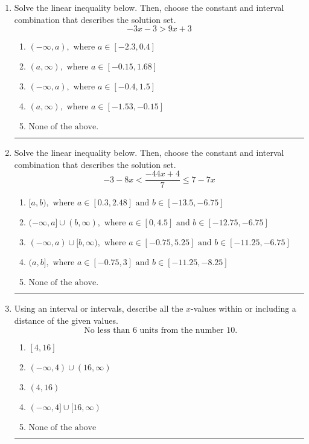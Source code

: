 \documentclass[14pt]{extbook}
\newcommand{\litem}[1]{\item#1\hspace*{-1cm}\rule{\textwidth}{0.4pt}}
\begin{document}
\begin{enumerate}
\litem{
Solve the linear inequality below. Then, choose the constant and interval combination that describes the solution set.\[ -3x -3 > 9x + 3 \]\begin{enumerate}[label=\Alph*.]
\item \( (-\infty, a), \text{ where } a \in [-2.3, 0.4] \)
\item \( (a, \infty), \text{ where } a \in [-0.15, 1.68] \)
\item \( (-\infty, a), \text{ where } a \in [-0.4, 1.5] \)
\item \( (a, \infty), \text{ where } a \in [-1.53, -0.15] \)
\item \( \text{None of the above}. \)

\end{enumerate} }
\litem{
Solve the linear inequality below. Then, choose the constant and interval combination that describes the solution set.\[ -3 - 8 x < \frac{-44 x + 4}{7} \leq 7 - 7 x \]\begin{enumerate}[label=\Alph*.]
\item \( [a, b), \text{ where } a \in [0.3, 2.48] \text{ and } b \in [-13.5, -6.75] \)
\item \( (-\infty, a] \cup (b, \infty), \text{ where } a \in [0, 4.5] \text{ and } b \in [-12.75, -6.75] \)
\item \( (-\infty, a) \cup [b, \infty), \text{ where } a \in [-0.75, 5.25] \text{ and } b \in [-11.25, -6.75] \)
\item \( (a, b], \text{ where } a \in [-0.75, 3] \text{ and } b \in [-11.25, -8.25] \)
\item \( \text{None of the above.} \)

\end{enumerate} }
\litem{
Using an interval or intervals, describe all the $x$-values within or including a distance of the given values.\[ \text{ No less than } 6 \text{ units from the number } 10. \]\begin{enumerate}[label=\Alph*.]
\item \( [4, 16] \)
\item \( (-\infty, 4) \cup (16, \infty) \)
\item \( (4, 16) \)
\item \( (-\infty, 4] \cup [16, \infty) \)
\item \( \text{None of the above} \)


\end{enumerate}}
\end{enumerate}
\end{document}

